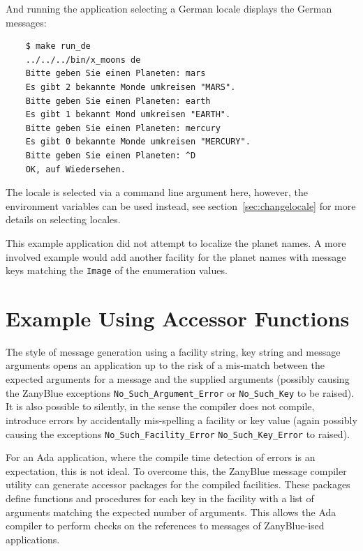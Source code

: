 And running the application selecting a German locale displays the German
messages:
\begin{xmpl}
\begin{verbatim}
    $ make run_de
    ../../../bin/x_moons de
    Bitte geben Sie einen Planeten: mars
    Es gibt 2 bekannte Monde umkreisen "MARS".
    Bitte geben Sie einen Planeten: earth
    Es gibt 1 bekannt Mond umkreisen "EARTH".
    Bitte geben Sie einen Planeten: mercury
    Es gibt 0 bekannte Monde umkreisen "MERCURY".
    Bitte geben Sie einen Planeten: ^D
    OK, auf Wiedersehen.
\end{verbatim}
\end{xmpl}
The locale is selected via a command line argument here, however, the
environment variables can be used instead, see section~\ref{sec:changelocale}
for more details on selecting locales.

This example application did not attempt to localize the planet names.  A
more involved example would add another facility for the planet names with
message keys matching the \texttt{Image} of the enumeration values.

\section{Example Using Accessor Functions}

The style of message generation using a facility string, key string and
message arguments opens an application up to the risk of a mis-match between
the expected arguments for a message and the supplied arguments (possibly
causing the ZanyBlue exceptions \texttt{No\_Such\_Argument\_Error} or
\texttt{No\_Such\_Key} to be raised).  It is also possible to silently, in
the sense the compiler does not compile, introduce errors by accidentally
mis-spelling a facility or key value (again possibly causing the exceptions
\texttt{No\_Such\_Facility\_Error} \texttt{No\_Such\_Key\_Error} to raised).

For an Ada application, where the compile time detection of errors is an
expectation, this is not ideal.  To overcome this, the ZanyBlue message
compiler utility can generate accessor packages for the compiled facilities.
These packages define functions and procedures for each key in the facility
with a list of arguments matching the expected number of arguments.  This
allows the Ada compiler to perform checks on the references to messages of
ZanyBlue-ised applications.

